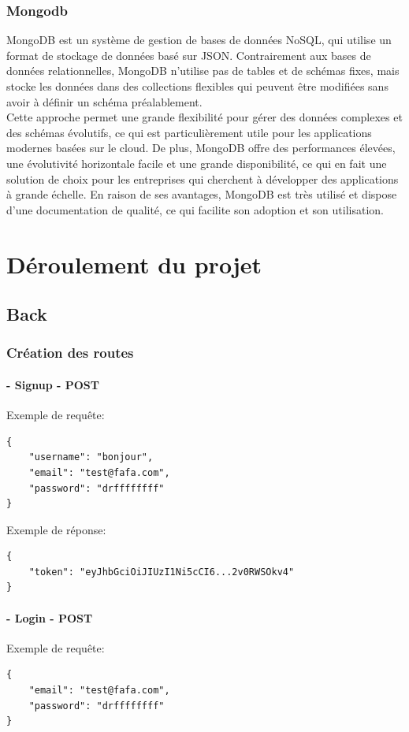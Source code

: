 \documentclass[a4paper,12pt]{report}
\begin{document}
\subsection{Mongodb}
MongoDB est un système de gestion de bases de données NoSQL, qui utilise un format de stockage de données basé sur JSON. Contrairement aux bases de données relationnelles, MongoDB n'utilise pas de tables et de schémas fixes, mais stocke les données dans des collections flexibles qui peuvent être modifiées sans avoir à définir un schéma préalablement.\\
Cette approche permet une grande flexibilité pour gérer des données complexes et des schémas évolutifs, ce qui est particulièrement utile pour les applications modernes basées sur le cloud. De plus, MongoDB offre des performances élevées, une évolutivité horizontale facile et une grande disponibilité, ce qui en fait une solution de choix pour les entreprises qui cherchent à développer des applications à grande échelle.
En raison de ses avantages, MongoDB est très utilisé et dispose d'une documentation de qualité, ce qui facilite son adoption et son utilisation.


\chapter{Déroulement du projet}

\section{Back}
\subsection{Création des routes}
\subsubsection{- Signup - POST}
Exemple de requête:
\begin{lstlisting}
{
	"username": "bonjour",
	"email": "test@fafa.com",
	"password": "drffffffff"
}
\end{lstlisting}

Exemple de réponse:
\begin{lstlisting}
{
	"token": "eyJhbGciOiJIUzI1Ni5cCI6...2v0RWSOkv4"
}
\end{lstlisting}

\subsubsection{- Login - POST}
Exemple de requête:
\begin{lstlisting}
{
  	"email": "test@fafa.com",
  	"password": "drffffffff"
}
\end{lstlisting}
\end{document}
